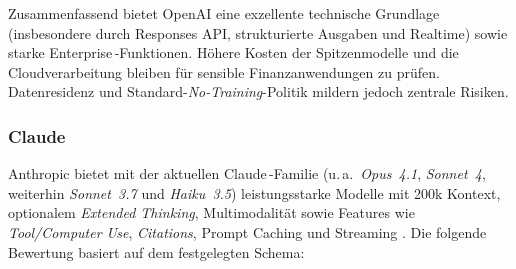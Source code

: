       Zusammenfassend bietet OpenAI eine exzellente technische Grundlage (insbesondere durch Responses \acs{API}, strukturierte Ausgaben und Realtime) sowie starke Enterprise\,-Funktionen.
      Höhere Kosten der Spitzenmodelle und die Cloudverarbeitung bleiben für sensible Finanzanwendungen zu prüfen.
      Datenresidenz und Standard-\emph{No-Training}-Politik mildern jedoch zentrale Risiken.

      \global\def\VOpenAIAPI               {3}
      \global\def\VOpenAIPerformance       {3}
      \global\def\VOpenAIKosten            {1}
      \global\def\VOpenAIAnpassung         {1}
      \global\def\VOpenAIDatenschutz       {1}
      \global\def\VOpenAISupport           {3}
      \global\def\VOpenAIDokumentation     {3}

    \subsubsection{Claude}

      Anthropic bietet mit der aktuellen Claude\,-Familie (u.\,a.\ \emph{Opus~4{.}1}, \emph{Sonnet~4}, weiterhin \emph{Sonnet~3{.}7} und \emph{Haiku~3{.}5}) leistungsstarke Modelle mit 200k Kontext, optionalem \emph{Extended Thinking}, Multimodalität sowie Features wie \emph{Tool/Computer Use}, \emph{Citations}, Prompt Caching und Streaming \autocite{anthropic-docs-2025}.
      Die folgende Bewertung basiert auf dem festgelegten Schema:

